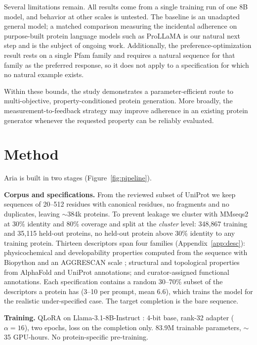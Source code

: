\documentclass{article}
\newcommand{\pct}{\%}
\begin{document}
Several limitations remain. All results come from a single training run of one 8B model, and behavior at other scales is untested. The baseline is an unadapted general model; a matched comparison measuring the incidental adherence on purpose-built protein language models such as ProLLaMA is our natural next step and is the subject of ongoing work. Additionally, the preference-optimization result rests on a single Pfam family and requires a natural sequence for that family as the preferred response, so it does not apply to a specification for which no natural example exists. 

Within these bounds, the study demonstrates a parameter-efficient route to multi-objective, property-conditioned protein generation. More broadly, the measurement-to-feedback strategy may improve adherence in an existing protein generator whenever the requested property can be reliably evaluated.




\newpage
\appendix
\section{Method}\label{app:method}


Aria is built in two stages (Figure~\ref{fig:pipeline}). 

\textbf{Corpus and specifications.} From the reviewed subset of UniProt
\citep{uniprot2023} we keep sequences of 20--512 residues with canonical
residues, no fragments and no duplicates, leaving $\sim$384k proteins. To
prevent leakage we cluster with MMseqs2 \citep{steinegger2017mmseqs2} at
30\pct{} identity and 80\pct{} coverage and split at the \emph{cluster} level:
348{,}867 training and 35{,}115 held-out proteins, no held-out protein above
30\pct{} identity to any training protein. Thirteen descriptors span four
families (Appendix~\ref{app:desc}): physicochemical and developability
properties computed from the sequence with Biopython \citep{cock2009biopython}
and an AGGRESCAN scale \citep{conchillosole2007aggrescan}; structural and
topological properties from AlphaFold \citep{jumper2021alphafold} and UniProt
annotations; and curator-assigned functional annotations. Each specification
contains a random 30--70\pct{} subset of the descriptors a protein has (3--10
per prompt, mean 6.6), which trains the model for the realistic
under-specified case. The target completion is the bare sequence.

\textbf{Training.} QLoRA \citep{dettmers2023qlora, hu2022lora} on
Llama-3.1-8B-Instruct \citep{dubey2024llama3}: 4-bit base, rank-32 adapter
($\alpha=16$), two epochs, loss on the completion only. 83.9M trainable
parameters, $\sim$35 GPU-hours. No protein-specific pre-training.
\end{document}
